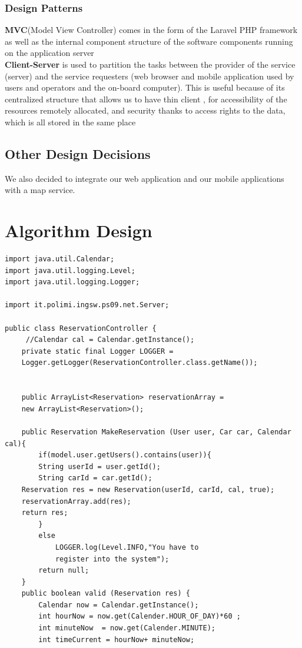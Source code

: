 \documentclass{article}
\begin{document}
\begin{flushleft}
\subsubsection{Design Patterns}

\textbf{MVC}(Model View Controller) comes in the form of the Laravel PHP framework as well as the internal component structure of the software components running on the application server\\
\textbf{Client-Server}  is used to partition the tasks between the provider of the service (server) and the service requesters (web browser and mobile application used by users and operators and the on-board computer). This is useful because of its centralized structure that allows us to have thin client , for accessibility of the resources remotely allocated, and security  thanks to access rights to the data, which is all stored in the same place


\subsection{Other Design Decisions} %
We also decided to integrate our web application and our mobile applications with a map service.

\section{Algorithm Design} %
\begin{lstlisting}
import java.util.Calendar;
import java.util.logging.Level;
import java.util.logging.Logger;

import it.polimi.ingsw.ps09.net.Server;

public class ReservationController {
	 //Calendar cal = Calendar.getInstance();
	private static final Logger LOGGER = 
	Logger.getLogger(ReservationController.class.getName());
    
	
	public ArrayList<Reservation> reservationArray = 
	new ArrayList<Reservation>();
	
	public Reservation MakeReservation (User user, Car car, Calendar cal){
		if(model.user.getUsers().contains(user)){
		String userId = user.getId();
		String carId = car.getId();
	Reservation res = new Reservation(userId, carId, cal, true);
	reservationArray.add(res);
	return res;
		}
		else 
			LOGGER.log(Level.INFO,"You have to 
			register into the system");
		return null;
	}
	public boolean valid (Reservation res) {
		Calendar now = Calendar.getInstance();
		int hourNow = now.get(Calender.HOUR_OF_DAY)*60 ;
		int minuteNow  = now.get(Calender.MINUTE);
		int timeCurrent = hourNow+ minuteNow;
		

\end{lstlisting}
\end{flushleft}
\end{document}
